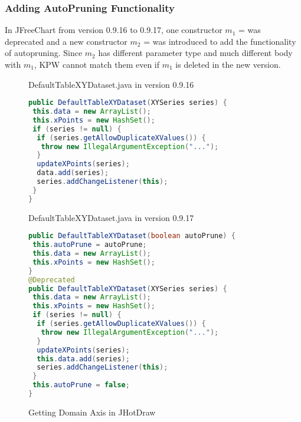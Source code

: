 \subsubsection{Adding AutoPruning Functionality}

In JFreeChart from version 0.9.16 to 0.9.17, one constructor $m_1$ =  was deprecated and a new constructor $m_2$ =  was introduced to add the functionality of autopruning. Since $m_2$ has different parameter type and much different body with $m_1$, KPW cannot match them even if $m_1$ is deleted in the new version.

\begin{figure}[t]
DefaultTableXYDataset.java in version 0.9.16
\begin{lstlisting}[basicstyle=\scriptsize\sffamily, language = Java]
public DefaultTableXYDataset(XYSeries series) {
 this.data = new ArrayList();
 this.xPoints = new HashSet();
 if (series != null) {
  if (series.getAllowDuplicateXValues()) {
   throw new IllegalArgumentException("...");
  }
  updateXPoints(series);
  data.add(series);
  series.addChangeListener(this);
 }
}
\end{lstlisting}
DefaultTableXYDataset.java in version 0.9.17
\begin{lstlisting}[basicstyle=\scriptsize\sffamily, language = Java]
public DefaultTableXYDataset(boolean autoPrune) {
 this.autoPrune = autoPrune;
 this.data = new ArrayList();
 this.xPoints = new HashSet();
}
@Deprecated
public DefaultTableXYDataset(XYSeries series) {
 this.data = new ArrayList();
 this.xPoints = new HashSet();
 if (series != null) {
  if (series.getAllowDuplicateXValues()) {
   throw new IllegalArgumentException("...");
  }
  updateXPoints(series);
  this.data.add(series);
  series.addChangeListener(this);
 }
 this.autoPrune = false;
}
\end{lstlisting}
\caption{Getting Domain Axis in JHotDraw}
\label{plot}
\end{figure}
